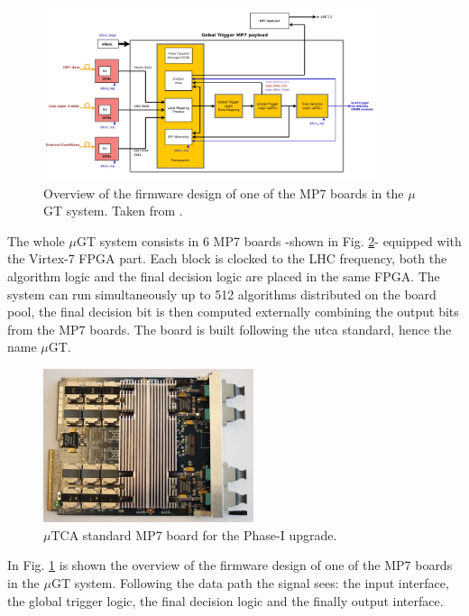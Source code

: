 \documentclass[../../main.tex]{subfiles}
\begin{document}
\begin{figure}[h]
    \centering
    \includegraphics[width=0.87\textwidth]{sections/02/Images/P1GT-overview.jpg}
    \caption{Overview of the firmware design of one of the MP7 boards in the $\mu$GT system. Taken from \cite{uGT}.}
    \label{fig:uGT-firmware}
\end{figure}

The whole $\mu$GT system consists in 6 MP7 boards -shown in Fig. \ref{fig:Phase-1_MP7}- equipped with the Virtex-7 FPGA part. Each block is clocked to the LHC frequency, both the algorithm logic and the final decision logic are placed in the same FPGA. The system can run simultaneously up to 512 algorithms distributed on the board pool, the final decision bit is then computed externally combining the output bits from the MP7 boards. The board is built following the \acrshort{utca} standard, hence the name $\mu$GT.

\begin{figure}[h]
    \centering
    \includegraphics[width=0.55\textwidth]{sections/02/Images/MP7_board.jpg}
    \caption{$\mu$TCA standard MP7 board for the Phase-I upgrade.}
    \label{fig:Phase-1_MP7}
\end{figure}

In Fig. \ref{fig:uGT-firmware} is shown the overview of the firmware design of one of the MP7 boards in the $\mu$GT system. Following the data path the signal sees: the input interface, the global trigger logic, the final decision logic and the finally output interface. 
\end{document}
